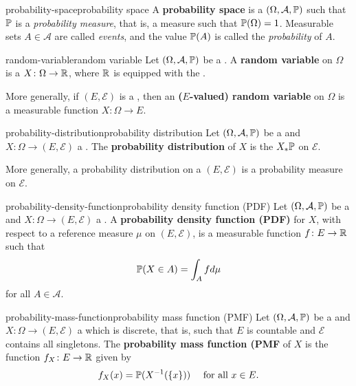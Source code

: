 \begin{topic}{probability-space}{probability space}
    A \textbf{probability space} is a  $(\Omega, \mathcal{A}, \mathbb{P})$ such that $\mathbb{P}$ is a \textit{probability measure}, that is, a measure such that $\mathbb{P}(\Omega) = 1$. Measurable sets $A \in \mathcal{A}$ are called \textit{events}, and the value $\mathbb{P}(A)$ is called the \textit{probability} of $A$.
\end{topic}

\begin{topic}{random-variable}{random variable}
    Let $(\Omega, \mathcal{A}, \mathbb{P})$ be a . A \textbf{random variable} on $\Omega$ is a  $X \colon \Omega \to \mathbb{R}$, where $\mathbb{R}$ is equipped with the .
    
    More generally, if $(E, \mathcal{E})$ is a , then an \textbf{($E$-valued) random variable} on $\Omega$ is a measurable function $X \colon \Omega \to E$.
\end{topic}

\begin{topic}{probability-distribution}{probability distribution}
    Let $(\Omega, \mathcal{A}, \mathbb{P})$ be a  and $X \colon \Omega \to (E, \mathcal{E})$ a . The \textbf{probability distribution} of $X$ is the  $X_* \mathbb{P}$ on $\mathcal{E}$.

    More generally, a probability distribution on a  $(E, \mathcal{E})$ is a probability measure on $\mathcal{E}$.
\end{topic}

\begin{topic}{probability-density-function}{probability density function (PDF)}
    Let $(\Omega, \mathcal{A}, \mathbb{P})$ be a  and $X \colon \Omega \to (E, \mathcal{E})$ a . A \textbf{probability density function (PDF)} for $X$, with respect to a reference measure $\mu$ on $(E, \mathcal{E})$, is a measurable function $f \colon E \to \mathbb{R}$ such that
    \[ \mathbb{P}(X \in A) = \int_A f d \mu \]
    for all $A \in \mathcal{A}$.
\end{topic}

\begin{topic}{probability-mass-function}{probability mass function (PMF)}
    Let $(\Omega, \mathcal{A}, \mathbb{P})$ be a  and $X \colon \Omega \to (E, \mathcal{E})$ a  which is discrete, that is, such that $E$ is countable and $\mathcal{E}$ contains all singletons. The \textbf{probability mass function (PMF} of $X$ is the function $f_X \colon E \to \mathbb{R}$ given by
    \[ f_X(x) = \mathbb{P}(X^{-1}(\{ x \})) \quad \textup{ for all } x \in E . \]
    
\end{topic}


